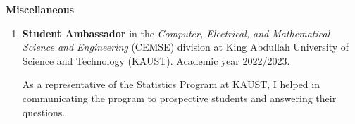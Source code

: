 \documentclass[11pt, ]{article}
\begin{document}
	
	\vspace{6pt}
	
	{\Large \textbf{Miscellaneous}}
	
	\begin{enumerate}
		\item \textbf{Student Ambassador} in the\textit{ Computer, Electrical,  and Mathematical Science and Engineering} (CEMSE) division at King Abdullah University of Science and Technology (KAUST). Academic year 2022/2023.
		
		As a representative of the Statistics Program at KAUST, I helped in communicating the program to prospective students and answering their questions.
	\end{enumerate}
	
	
	
	
\end{document}
